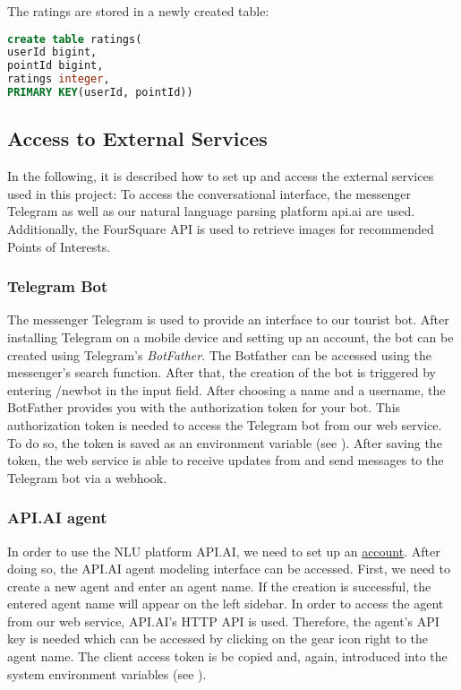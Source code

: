 The ratings are stored in a newly created table:
\begin{lstlisting}[language=sql]
create table ratings(
userId bigint,
pointId bigint,
ratings integer,
PRIMARY KEY(userId, pointId))
\end{lstlisting}

\subsection{Access to External Services}
In the following, it is described how to set up and access the external services used in this project:
To access the conversational interface, the messenger Telegram as well as our natural language parsing platform api.ai are used. Additionally, the FourSquare API is used to retrieve images for recommended Points of Interests.

\subsubsection{Telegram Bot}
 The messenger Telegram is used to provide an interface to our tourist bot. After installing Telegram on a mobile device and setting up an account, the bot can be created using Telegram’s \textit{BotFather}. The Botfather can be accessed using the messenger’s search function. After that, the creation of the bot is triggered by entering /newbot in the input field.
After choosing a name and a username, the BotFather provides you with the authorization token for your bot. This authorization token is needed to access the Telegram bot from our web service. To do so, the token is saved as an environment variable (see ). After saving the token, the web service is able to receive updates from and send messages to the Telegram bot via a webhook. 

\subsubsection{API.AI agent}
In order to use the NLU platform API.AI, we need to set up an \hyperlink{https://console.api.ai/api-client/}{account}. After doing so, the API.AI agent modeling interface can be accessed. First, we need to create a new agent and enter an agent name. 
If the creation is successful, the entered agent name will appear on the left sidebar. In order to access the agent from our web service, API.AI’s HTTP API is used. Therefore, the agent’s API key is needed which can be accessed by clicking on the gear icon right to the agent name. The client access token is be copied and, again, introduced into the system environment variables (see ).

